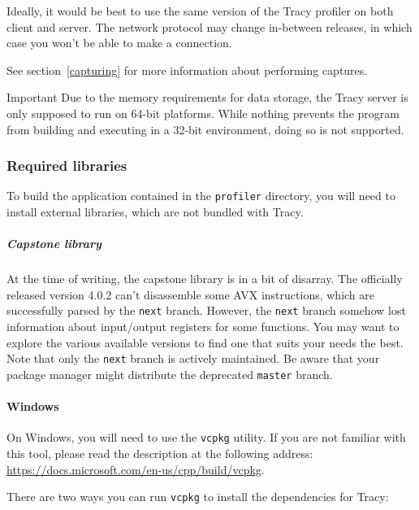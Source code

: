 \documentclass[hidelinks,titlepage,a4paper]{article}
\begin{document}
Ideally, it would be best to use the same version of the Tracy profiler on both client and server. The network protocol may change in-between releases, in which case you won't be able to make a connection.

See section~\ref{capturing} for more information about performing captures.

\begin{bclogo}[
noborder=true,
couleur=black!5,
logo=\bcbombe
]{Important}
Due to the memory requirements for data storage, the Tracy server is only supposed to run on 64-bit platforms. While nothing prevents the program from building and executing in a 32-bit environment, doing so is not supported.
\end{bclogo}

\subsubsection{Required libraries}

To build the application contained in the \texttt{profiler} directory, you will need to install external libraries, which are not bundled with Tracy.

\subparagraph{Capstone library} At the time of writing, the capstone library is in a bit of disarray. The officially released version 4.0.2 can't disassemble some AVX instructions, which are successfully parsed by the \texttt{next} branch. However, the \texttt{next} branch somehow lost information about input/output registers for some functions. You may want to explore the various available versions to find one that suits your needs the best. Note that only the \texttt{next} branch is actively maintained. Be aware that your package manager might distribute the deprecated \texttt{master} branch.

\paragraph{Windows}

On Windows, you will need to use the \texttt{vcpkg} utility. If you are not familiar with this tool, please read the description at the following address: \url{https://docs.microsoft.com/en-us/cpp/build/vcpkg}.

There are two ways you can run \texttt{vcpkg} to install the dependencies for Tracy:
\end{document}
